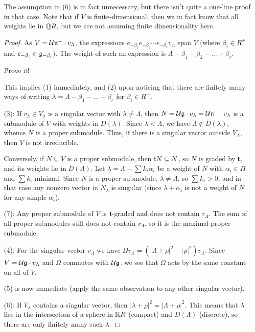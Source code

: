 \begin{remark}
The assumption in (6) is in fact unnecessary, but there isn't quite a
one-line proof in that case. Note that if $V$ is finite-dimensional, then we
in fact know that all weights lie in $\mathbb{Q} R$, but we are not assuming finite
dimensionality here.
\end{remark}

\begin{proof}
As $V = \mathcal{U}\mathfrak{n}^- \cdot v_\Lambda$, the expressions
$e_{-\beta_1}e_{-\beta_2}\cdots e_{-\beta_r}v_\Lambda$ span $V$ (where
$\beta_i \in R^+$ and $e_{-\beta_i} \in \mathfrak{g}_{-\beta_i}$). The weight of such an
expression is $\Lambda - \beta_1 - \beta_2 - \dots - \beta_r$.

\begin{exercise}
Prove it!
\end{exercise}

This implies (1) immediately, and (2) upon noticing that there are finitely
many ways of writing $\lambda = \Lambda - \beta_1 - \dots - \beta_r$ for
$\beta_i \in R^+$.

(3): If $v_\lambda \in V_\lambda$ is a singular vector with
$\lambda \neq \Lambda$, then
$N = \mathcal{U}\mathfrak{g} \cdot v_\lambda = \mathcal{U}\mathfrak{n}^- \cdot v_\lambda$ is a submodule of $V$ with
weights in $D(\lambda)$. Since $\lambda < \Lambda$, we have
$\Lambda \notin D(\lambda)$, whence $N$ is a proper submodule. Thus, if there
is a singular vector outside $V_\Lambda$, then $V$ is not irreducible.

Conversely, if $N \subseteq V$ is a proper submodule, then $\mathfrak{t} N \subseteq N$,
so $N$ is graded by $\mathfrak{t}$, and its weights lie in $D(\Lambda)$. Let
$\lambda = \Lambda - \sum k_i\alpha_i$ be a weight of $N$ with
$\alpha_i \in \Pi$ and $\sum k_i$ minimal. Since $N$ is a proper submodule,
$\lambda \neq \Lambda$, so $\sum k_i > 0$, and in that case any nonzero vector
in $N_\lambda$ is singular (since $\lambda + \alpha_i$ is not a weight of $N$
for any simple $\alpha_i$).

(7): Any proper submodule of $V$ is $\mathfrak{t}$-graded and does not contain
$v_\Lambda$. The sum of all proper submodules still does not contain
$v_\Lambda$, so it is the maximal proper submodule.

(4): For the singular vector $v_\Lambda$ we have
$\Omega v_\Lambda = (|\Lambda + \rho|^2 - |\rho|^2)v_\Lambda$. Since
$V = \mathcal{U}\mathfrak{g} \cdot v_\Lambda$ and $\Omega$ commutes with $\mathcal{U}\mathfrak{g}$, we see that
$\Omega$ acts by the same constant on all of $V$.

(5) is now immediate (apply the same observation to any other singular
vector).

(6): If $V_\lambda$ contains a singular vector, then
$|\lambda + \rho|^2 = |\Lambda + \rho|^2$. This means that $\lambda$ lies in
the intersection of a sphere in $\mathbb{R} R$ (compact) and $D(\Lambda)$ (discrete),
so there are only finitely many such $\lambda$.
\end{proof}

